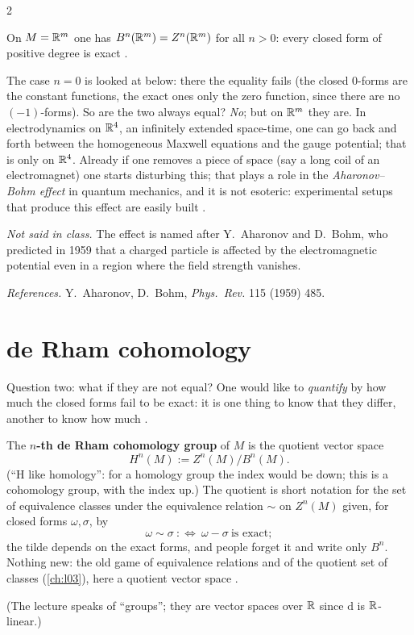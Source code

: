 \begin{paracol}{2}
\begin{theorem}\label{thm:gr-poincare}
On $M=\mathbb{R}^m$ one has $B^n(\mathbb{R}^m)=Z^n(\mathbb{R}^m)$ for all $n>0$: every closed form of positive degree is exact   .
\end{theorem}
The case $n=0$ is looked at below: there the equality fails (the closed $0$-forms are the constant functions, the exact ones only the zero function, since there are no $(-1)$-forms). So are the two always equal? \emph{No}; but on $\mathbb{R}^m$ they are. In electrodynamics on $\mathbb{R}^4$, an infinitely extended space-time, one can go back and forth between the homogeneous Maxwell equations and the gauge potential; that is only on $\mathbb{R}^4$. Already if one removes a piece of space (say a long coil of an electromagnet)
one starts disturbing this; that plays a role in the \emph{Aharonov--Bohm effect} in quantum mechanics, and it is not esoteric: experimental setups that produce this effect are easily built    .
\begin{history}
\emph{Not said in class.} The effect is named after Y.~Aharonov and D.~Bohm, who predicted in 1959 that a charged particle is affected by the electromagnetic potential even in a region where the field strength vanishes.\par
\smallskip
\emph{References.} Y.~Aharonov, D.~Bohm, \emph{Phys.\ Rev.} 115 (1959) 485.
\end{history}

\section{de Rham cohomology}\label{sec:gr-derham}

Question two: what if they are not equal? One would like to \emph{quantify} by how much the closed forms fail to be exact: it is one thing to know that they differ, another to know how much   .
\begin{definition}\label{def:gr-derham}
The \textbf{$n$-th de Rham cohomology group} of $M$ is the quotient vector space
\[
  H^n(M):=Z^n(M)\big/B^n(M).
\]
(``H like homology'': for a homology group the index would be down; this is a cohomology group, with the index up.) The quotient is short notation for the set of equivalence classes under the equivalence relation $\sim$ on $Z^n(M)$ given, for closed forms $\omega,\sigma$, by
\[
  \omega\sim\sigma\ :\Longleftrightarrow\ \omega-\sigma\ \text{is exact};
\]
the tilde depends on the exact forms, and people forget it and write only $B^n$. Nothing new: the old game of equivalence relations and of the quotient set of classes (\cref{ch:l03}), here a quotient vector space       .
\end{definition}
(The lecture speaks of ``groups''; they are vector spaces over $\mathbb{R}$ since $\mathrm d$ is $\mathbb{R}$-linear.)


\end{paracol}
